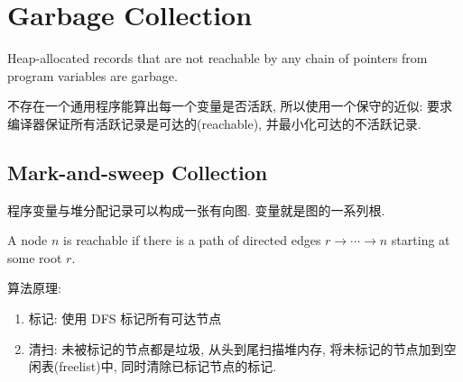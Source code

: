 \newpage
\section{Garbage Collection}

\begin{definition}[Garbage]
    Heap-allocated records that are not reachable by any chain of pointers from program variables are garbage.
\end{definition}


不存在一个通用程序能算出每一个变量是否活跃, 所以使用一个保守的近似: 要求编译器保证所有活跃记录是可达的(reachable), 并最小化可达的不活跃记录. 

\subsection{Mark-and-sweep Collection}
程序变量与堆分配记录可以构成一张有向图. 变量就是图的一系列根.

\begin{definition}[reachable]
    A node $n$ is reachable if there is a path of directed edges $r \to\cdots \to  n$ starting at some root $r$.
\end{definition}

算法原理:
\begin{enumerate}
    \item 标记: 使用 DFS 标记所有可达节点
    \item 清扫: 未被标记的节点都是垃圾, 从头到尾扫描堆内存, 将未标记的节点加到空闲表(freelist)中, 同时清除已标记节点的标记. 
\end{enumerate}


